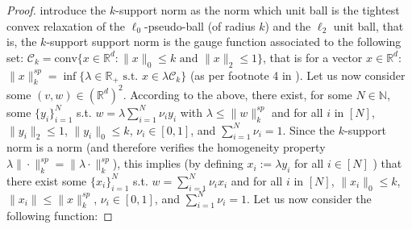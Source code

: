 \documentclass{article}
\begin{document}
\begin{proof}
\cite{argyriou2012sparse} introduce the $k$-support norm as the norm which unit ball is the tightest convex relaxation of the $\ell_0$-pseudo-ball (of radius $k$) and the $\ell_2$ unit ball, that is, the $k$-support support norm is the gauge function associated to the following set: $\mathcal{C}_k = \text{conv}\{x \in \mathbb{R}^d: \| x\|_0 \leq k \text{ and } \| x\|_2\leq 1\}$, that is for a vector $x \in \mathbb{R}^d$: $\| x \|_{k}^{sp} = \inf \{ \lambda \in \mathbb{R}_{+} \text{ s.t. }  x \in \lambda \mathcal{C}_k\}$ (as per  footnote 4 in \cite{argyriou2012sparse}).  Let us now consider some $(v, w) \in (\mathbb{R}^d)^2$. 
According to the above, there exist, for some $N \in \mathbb{N}$, some $\{y_i\}_{i=1}^N$ s.t. $w = \lambda \sum_{i=1}^N \nu_i y_i $ with $\lambda \leq \| w\|_{k}^{sp}$ and for all $i$ in $[N]$, $\| y_i\|_2 \leq 1$, $\|y_i \|_0 \leq k$, $\nu_i \in [0, 1]$, and $\sum_{i=1}^N \nu_i = 1$. Since the $k$-support norm is a norm (and therefore verifies the homogeneity property $\lambda \|\cdot \|_{k}^{sp} = \|\lambda \cdot \|_{k}^{sp}$), this implies (by defining $x_i := \lambda y_i$ for all $i \in [N]$ ) that there exist  some $\{x_i\}_{i=1}^N$ s.t. $w = \sum_{i=1}^N \nu_i x_i $ and for all $i$ in $[N]$,  $\|x_i \|_0 \leq k$, $\| x_i\| \leq \| x \|_{k}^{sp}$, $\nu_i \in [0, 1]$, and $\sum_{i=1}^N \nu_i = 1$.
Let us now consider the following function: 


\end{proof}
\end{document}
